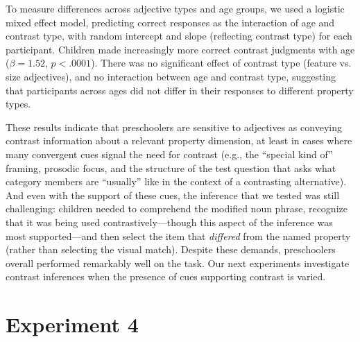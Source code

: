 \documentclass[man]{apa2}
\begin{document}
To measure differences across adjective types and age groups, we used a logistic mixed effect model, predicting correct responses as the interaction of age and contrast type, with random intercept and slope (reflecting contrast type) for each participant. Children made increasingly more correct contrast judgments with age ($\beta = 1.52$, $p < .0001$). There was no significant effect of contrast type (feature vs. size adjectives), and no interaction between age and contrast type, suggesting that participants across ages did not differ in their responses to different property types.  

These results indicate that preschoolers are sensitive to adjectives as conveying contrast information about a relevant property dimension, at least in cases where many convergent cues signal the need for contrast (e.g., the ``special kind of'' framing, prosodic focus, and the structure of the test question that asks what category members are ``usually'' like in the context of a contrasting alternative). And even with the support of these cues, the inference that we tested was still challenging: children needed to comprehend the modified noun phrase, recognize that it was being used contrastively---though this aspect of the inference was most supported---and then select the item that \emph{differed} from the named property (rather than selecting the visual match). Despite these demands, preschoolers overall performed remarkably well on the task. Our next experiments investigate contrast inferences when the presence of cues supporting contrast is varied.






\section{Experiment 4} 
\end{document}
